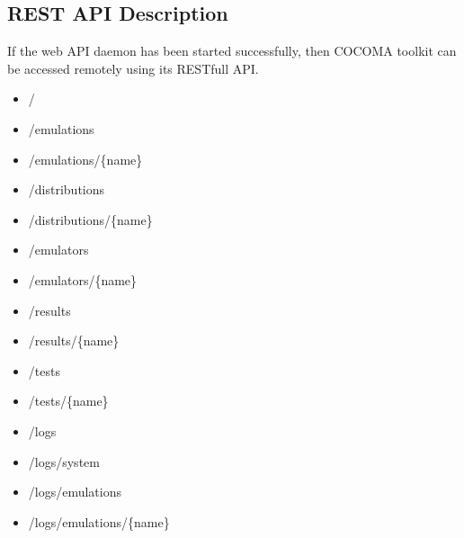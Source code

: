 \documentclass[letterpaper,10pt,english]{sphinxmanual}
\begin{document}
\subsection{REST API Description}
\label{01_how_to_use_it:rest-api-description}
If the web API daemon has been started successfully, then COCOMA toolkit can be accessed remotely using its RESTfull API.
\begin{itemize}
\item {} 
/

\item {} 
/emulations

\item {} 
/emulations/\{name\}

\item {} 
/distributions

\item {} 
/distributions/\{name\}

\item {} 
/emulators

\item {} 
/emulators/\{name\}

\item {} 
/results

\item {} 
/results/\{name\}

\item {} 
/tests

\item {} 
/tests/\{name\}

\item {} 
/logs

\item {} 
/logs/system

\item {} 
/logs/emulations

\item {} 
/logs/emulations/\{name\}

\end{itemize}
\end{document}
